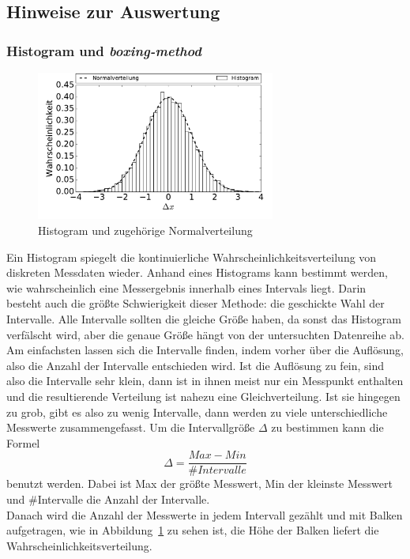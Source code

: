 \subsection*{Hinweise zur Auswertung}

\subsubsection*{Histogram und \emph{boxing-method}}
\begin{figure}[h!]
  \centering
  \includegraphics[width=0.7\textwidth]{figures/histogram}
  \caption{Histogram und zugehörige Normalverteilung}\label{fig:histo}
\end{figure}
Ein Histogram spiegelt die kontinuierliche Wahrscheinlichkeitsverteilung von diskreten Messdaten wieder. Anhand eines Histograms kann bestimmt werden, wie wahrscheinlich eine Messergebnis innerhalb eines Intervals liegt. Darin besteht auch die größte Schwierigkeit dieser Methode: die geschickte Wahl der Intervalle. Alle Intervalle sollten die gleiche Größe haben, da sonst das Histogram verfälscht wird, aber die genaue Größe hängt von der untersuchten  Datenreihe ab.\\
Am einfachsten lassen sich die Intervalle finden, indem vorher über die Auflösung, also die Anzahl der Intervalle entschieden wird.  Ist die Auflösung zu fein, sind also die Intervalle sehr klein, dann ist in ihnen meist nur ein Messpunkt enthalten und die resultierende Verteilung ist nahezu eine Gleichverteilung. Ist sie hingegen zu grob, gibt es also zu wenig Intervalle, dann werden zu viele unterschiedliche Messwerte zusammengefasst. Um die Intervallgröße $\Delta$ zu bestimmen kann die Formel
\begin{equation}
  \Delta = \frac{Max - Min}{\#Intervalle}
\end{equation}
benutzt werden. Dabei ist Max der größte Messwert, Min der kleinste Messwert und \#Intervalle die Anzahl der Intervalle.\\
Danach wird die Anzahl der Messwerte in jedem Intervall gezählt und mit Balken aufgetragen, wie in Abbildung~\ref{fig:histo} zu sehen ist, die Höhe der Balken liefert die Wahrscheinlichkeitsverteilung.

